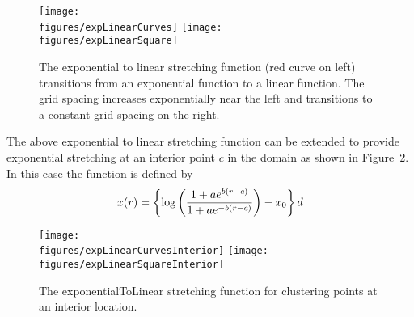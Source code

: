 \begin{figure}
  \begin{center}
    \texttt{[image: \\figures/expLinearCurves]}
    \texttt{[image: \\figures/expLinearSquare]}
  \end{center}
  \caption{The exponential to linear stretching function (red curve on left) transitions 
    from an exponential function to a linear function. The grid spacing increases exponentially near the left
    and transitions to a constant grid spacing on the right.} \label{fig:expLinear}
\end{figure}


The above exponential to linear stretching function can be extended to provide exponential stretching
at an interior point $c$ in the domain as shown in Figure~\ref{fig:expLinearInteruor}. In this case the function is defined by 
\begin{equation}
  x(r) = \left\{ \log\left( { 1 + a e^{b (r-c)} \over  1 + a e^{-b (r-c)} } \right)  - x_0 \right\} d 
\end{equation}
\begin{figure}
  \begin{center}
    \texttt{[image: \\figures/expLinearCurvesInterior]}
    \texttt{[image: \\figures/expLinearSquareInterior]}
  \end{center}
  \caption{The exponentialToLinear stretching function for clustering points at an interior location.}
    \label{fig:expLinearInteruor}
\end{figure}



